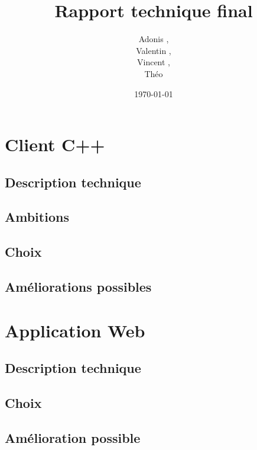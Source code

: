 \documentclass[a4paper]{article}
\title{Rapport technique final}
\author{Adonis \bsc{Najimi},\\
 Valentin \bsc{Stern},\\
 Vincent \bsc{Albert},\\
 Théo \bsc{Gerriet}}
\date{\today}
\begin{document}
\maketitle
\newpage

\section{Client C++}
    \subsection{Description technique}
    

    \subsection{Ambitions}
    

    \subsection{Choix}
    
    
    \subsection{Améliorations possibles}
    

\newpage
\section{Application Web}
	\subsection{Description technique}
	
	\subsection{Choix}
	
	\subsection{Amélioration possible}
	
\newpage
\tableofcontents
\end{document}
